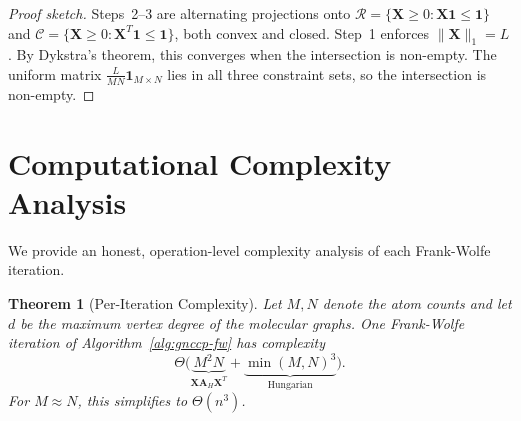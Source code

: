 \documentclass[conference]{IEEEtran}
\newtheorem{theorem}{Theorem}
\begin{document}
\begin{proof}[Proof sketch]
Steps~2--3 are alternating projections onto
$\mathcal{R}\!=\!\{\mathbf{X}\!\geq\!0 : \mathbf{X}\mathbf{1}\!\leq\!\mathbf{1}\}$
and
$\mathcal{C}\!=\!\{\mathbf{X}\!\geq\!0 : \mathbf{X}^{T}\!\mathbf{1}\!\leq\!\mathbf{1}\}$,
both convex and closed.
Step~1 enforces $\|\mathbf{X}\|_1\!=\!L$.
By Dykstra's theorem, this converges when the intersection
is non-empty.
The uniform matrix $\frac{L}{MN}\mathbf{1}_{M\times N}$
lies in all three constraint sets, so the intersection is non-empty.
\end{proof}


\section{Computational Complexity Analysis}
\label{sec:complexity}

We provide an honest, operation-level complexity analysis
of each Frank-Wolfe iteration.

\begin{theorem}[Per-Iteration Complexity]
\label{thm:complexity}
Let $M,N$ denote the atom counts and let $d$ be the maximum
vertex degree of the molecular graphs.
One Frank-Wolfe iteration of Algorithm~\ref{alg:gnccp-fw}
has complexity
\begin{equation}
\Theta\!\bigl(\underbrace{M^2 N}_{\mathbf{X}\mathbf{A}_H\mathbf{X}^T}
+ \underbrace{\min(M,N)^3}_{\text{Hungarian}}\bigr).
\label{eq:iter-complexity}
\end{equation}
For $M \!\approx\! N$, this simplifies to $\Theta(n^3)$.
\end{theorem}
\end{document}
